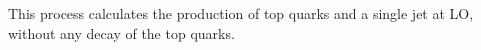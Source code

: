 This process calculates the production of top quarks and a single jet
at LO, without any decay of the top quarks.
